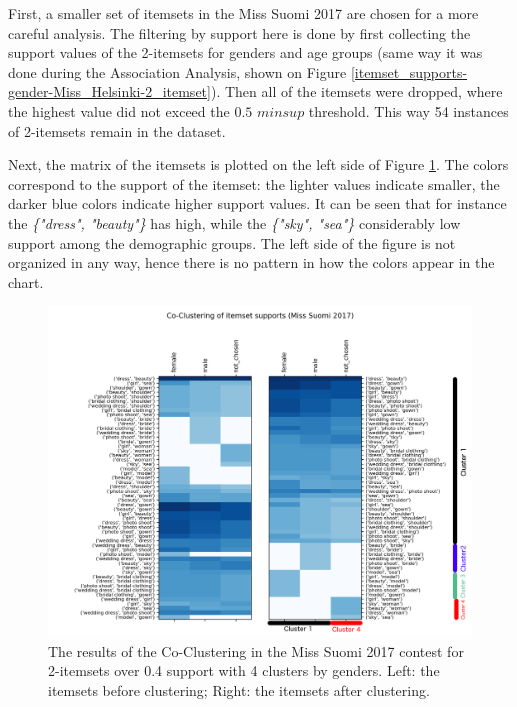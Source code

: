 First, a smaller set of itemsets in the Miss Suomi 2017 are chosen for a more careful analysis. The filtering by support here is done by first collecting the support values of the 2-itemsets for genders and age groups (same way it was done during the Association Analysis, shown on Figure \ref{itemset_supports-gender-Miss_Helsinki-2_itemset}). Then all of the itemsets were dropped, where the highest value did not exceed the $0.5$ $minsup$ threshold. This way 54 instances of 2-itemsets remain in the dataset.

Next, the matrix of the itemsets is plotted on the left side of Figure \ref{coclustering_miss-suomi-genders-2-itemsets-04_support}. The colors correspond to the support of the itemset: the lighter values indicate smaller, the darker blue colors indicate higher support values. It can be seen that for instance the \textit{\{"dress", "beauty"\}} has high, while the \textit{\{"sky", "sea"\}} considerably low support among the demographic groups. The left side of the figure is not organized in any way, hence there is no pattern in how the colors appear in the chart. 

\begin{figure}[h] 
    \begin{center}
        \includegraphics[width=1.0\textwidth]{Images/coclustering_miss-suomi-genders-2-itemsets-04_support.png}
        \caption{The results of the Co-Clustering in the Miss Suomi 2017 contest for 2-itemsets over 0.4 support with 4 clusters by genders. Left: the itemsets before clustering; Right: the itemsets after clustering.}
        \label{coclustering_miss-suomi-genders-2-itemsets-04_support}
    \end{center}
\end{figure}

